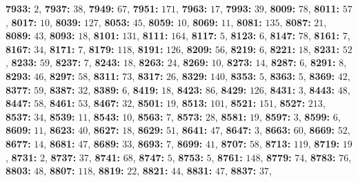 \textsf{\bfseries 7933:} $2$, \textsf{\bfseries 7937:} $38$, \textsf{\bfseries 7949:} $67$, \textsf{\bfseries 7951:} $171$, \textsf{\bfseries 7963:} $17$, \textsf{\bfseries 7993:} $39$, \textsf{\bfseries 8009:} $78$, \textsf{\bfseries 8011:} $57$, \textsf{\bfseries 8017:} $10$, \textsf{\bfseries 8039:} $127$, \textsf{\bfseries 8053:} $45$, \textsf{\bfseries 8059:} $10$, \textsf{\bfseries 8069:} $11$, \textsf{\bfseries 8081:} $135$, \textsf{\bfseries 8087:} $21$, \textsf{\bfseries 8089:} $43$, \textsf{\bfseries 8093:} $18$, \textsf{\bfseries 8101:} $131$, \textsf{\bfseries 8111:} $164$, \textsf{\bfseries 8117:} $5$, \textsf{\bfseries 8123:} $6$, \textsf{\bfseries 8147:} $78$, \textsf{\bfseries 8161:} $7$, \textsf{\bfseries 8167:} $34$, \textsf{\bfseries 8171:} $7$, \textsf{\bfseries 8179:} $118$, \textsf{\bfseries 8191:} $126$, \textsf{\bfseries 8209:} $56$, \textsf{\bfseries 8219:} $6$, \textsf{\bfseries 8221:} $18$, \textsf{\bfseries 8231:} $52$, \textsf{\bfseries 8233:} $59$, \textsf{\bfseries 8237:} $7$, \textsf{\bfseries 8243:} $18$, \textsf{\bfseries 8263:} $24$, \textsf{\bfseries 8269:} $10$, \textsf{\bfseries 8273:} $14$, \textsf{\bfseries 8287:} $6$, \textsf{\bfseries 8291:} $8$, \textsf{\bfseries 8293:} $46$, \textsf{\bfseries 8297:} $58$, \textsf{\bfseries 8311:} $73$, \textsf{\bfseries 8317:} $26$, \textsf{\bfseries 8329:} $140$, \textsf{\bfseries 8353:} $5$, \textsf{\bfseries 8363:} $5$, \textsf{\bfseries 8369:} $42$, \textsf{\bfseries 8377:} $59$, \textsf{\bfseries 8387:} $32$, \textsf{\bfseries 8389:} $6$, \textsf{\bfseries 8419:} $18$, \textsf{\bfseries 8423:} $86$, \textsf{\bfseries 8429:} $126$, \textsf{\bfseries 8431:} $3$, \textsf{\bfseries 8443:} $48$, \textsf{\bfseries 8447:} $58$, \textsf{\bfseries 8461:} $53$, \textsf{\bfseries 8467:} $32$, \textsf{\bfseries 8501:} $19$, \textsf{\bfseries 8513:} $101$, \textsf{\bfseries 8521:} $151$, \textsf{\bfseries 8527:} $213$, \textsf{\bfseries 8537:} $34$, \textsf{\bfseries 8539:} $11$, \textsf{\bfseries 8543:} $10$, \textsf{\bfseries 8563:} $7$, \textsf{\bfseries 8573:} $28$, \textsf{\bfseries 8581:} $19$, \textsf{\bfseries 8597:} $3$, \textsf{\bfseries 8599:} $6$, \textsf{\bfseries 8609:} $11$, \textsf{\bfseries 8623:} $40$, \textsf{\bfseries 8627:} $18$, \textsf{\bfseries 8629:} $51$, \textsf{\bfseries 8641:} $47$, \textsf{\bfseries 8647:} $3$, \textsf{\bfseries 8663:} $60$, \textsf{\bfseries 8669:} $52$, \textsf{\bfseries 8677:} $14$, \textsf{\bfseries 8681:} $47$, \textsf{\bfseries 8689:} $33$, \textsf{\bfseries 8693:} $7$, \textsf{\bfseries 8699:} $41$, \textsf{\bfseries 8707:} $58$, \textsf{\bfseries 8713:} $119$, \textsf{\bfseries 8719:} $19$, \textsf{\bfseries 8731:} $2$, \textsf{\bfseries 8737:} $37$, \textsf{\bfseries 8741:} $68$, \textsf{\bfseries 8747:} $5$, \textsf{\bfseries 8753:} $5$, \textsf{\bfseries 8761:} $148$, \textsf{\bfseries 8779:} $74$, \textsf{\bfseries 8783:} $76$, \textsf{\bfseries 8803:} $48$, \textsf{\bfseries 8807:} $118$, \textsf{\bfseries 8819:} $22$, \textsf{\bfseries 8821:} $44$, \textsf{\bfseries 8831:} $47$, \textsf{\bfseries 8837:} $37$, 
